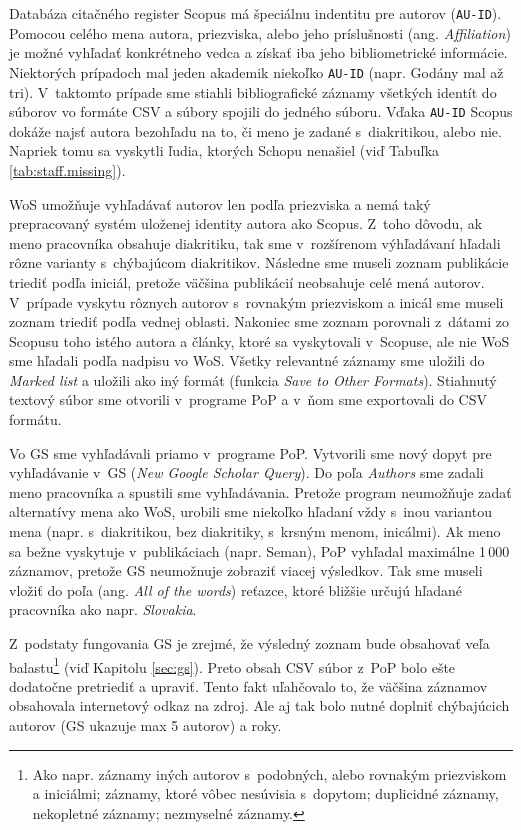 Databáza citačného register Scopus má špeciálnu indentitu pre autorov
(\texttt{AU-ID}).  Pomocou celého mena autora, priezviska, alebo jeho
príslušnosti (ang.  \emph{Affiliation}) je možné vyhľadať konkrétneho vedca a
získať iba jeho bibliometrické informácie. Niektorých prípadoch mal jeden
akademik niekoľko \texttt{AU-ID} (napr. Godány mal až tri). V~taktomto prípade
sme stiahli bibliografické záznamy všetkých identít do súborov vo formáte CSV a
súbory spojili do jedného súboru.  Vďaka  \texttt{AU-ID} Scopus dokáže najsť
autora bezohľadu na to, či meno je zadané s~diakritikou, alebo nie.  Napriek
tomu sa vyskytli ľudia, ktorých Schopu nenašiel (viď Tabuľka
\ref{tab:staff.missing}).

WoS umožňuje vyhľadávať autorov len podľa priezviska a nemá taký prepracovaný
systém uloženej identity autora ako Scopus. Z~toho dôvodu, ak meno pracovníka
obsahuje diakritiku, tak sme v~rozšírenom výhľadávaní hľadali rôzne varianty
s~chýbajúcom diakritikov. Následne sme museli zoznam publikácie triediť podľa
iniciál, pretože väčšina publikácií neobsahuje celé mená autorov. V~prípade
vyskytu rôznych autorov s~rovnakým priezviskom a inicál sme museli zoznam
triediť podľa vednej oblasti. Nakoniec sme zoznam porovnali z~dátami zo Scopusu
toho istého autora a články, ktoré sa vyskytovali v~Scopuse, ale nie WoS sme
hľadali podľa nadpisu vo WoS. Všetky relevantné záznamy sme uložili do
\emph{Marked list} a uložili ako iný formát (funkcia \emph{Save to Other
Formats}). Stiahnutý textový súbor sme otvorili v~programe PoP a v~ňom sme
exportovali do CSV formátu.

Vo GS sme vyhľadávali priamo v~programe PoP. Vytvorili sme nový dopyt pre
vyhľadávanie v~GS (\emph{New Google Scholar Query}). Do poľa  \emph{Authors}
sme zadali meno pracovníka a spustili sme vyhľadávania. Pretože program
neumožňuje zadať alternatívy mena ako WoS, urobili sme niekoľko hľadaní vždy
s~inou variantou mena (napr. s~diakritikou, bez diakritiky, s~krsným menom,
inicálmi).  Ak meno sa bežne vyskytuje v~publikáciach (napr. Seman), PoP
vyhľadal maximálne 1\,000 záznamov, pretože GS neumožnuje zobraziť viacej
výsledkov. Tak sme museli vložiť do poľa  (ang. \emph{All of
the words}) reťazce, ktoré bližšie určujú hľadané pracovníka ako napr.
\emph{Slovakia}. 

Z~podstaty fungovania GS je zrejmé, že výsledný zoznam bude obsahovať veľa
balastu\footnote{Ako napr. záznamy iných autorov s~podobných, alebo rovnakým
priezviskom a iniciálmi; záznamy, ktoré vôbec nesúvisia s~dopytom; duplicidné
záznamy, nekopletné záznamy; nezmyselné záznamy.} (viď Kapitolu \ref{sec:gs}).
Preto obsah CSV súbor z~PoP bolo ešte dodatočne pretriediť a upraviť. Tento fakt uľahčovalo 
to, že väčšina záznamov obsahovala internetový odkaz na zdroj. Ale aj tak
bolo nutné doplniť chýbajúcich autorov (GS ukazuje max 5 autorov) a roky.

